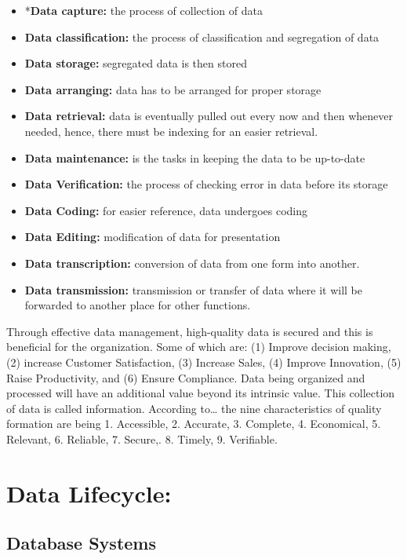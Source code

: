 \documentclass[
  letterpaper,
  DIV=11,
  numbers=noendperiod]{scrreprt}
\providecommand{\tightlist}{%
  \setlength{\itemsep}{0pt}\setlength{\parskip}{0pt}}\usepackage{longtable,booktabs,array}
\begin{document}
\begin{itemize}
\tightlist
\item
  *\textbf{Data capture:} the process of collection of data
\item
  \textbf{Data classification:} the process of classification and
  segregation of data
\item
  \textbf{Data storage:} segregated data is then stored
\item
  \textbf{Data arranging:} data has to be arranged for proper storage
\item
  \textbf{Data retrieval:} data is eventually pulled out every now and
  then whenever needed, hence, there must be indexing for an easier
  retrieval.
\item
  \textbf{Data maintenance:} is the tasks in keeping the data to be
  up-to-date
\item
  \textbf{Data Verification:} the process of checking error in data
  before its storage
\item
  \textbf{Data Coding:} for easier reference, data undergoes coding
\item
  \textbf{Data Editing:} modification of data for presentation
\item
  \textbf{Data transcription:} conversion of data from one form into
  another.
\item
  \textbf{Data transmission:} transmission or transfer of data where it
  will be forwarded to another place for other functions.
\end{itemize}

Through effective data management, high-quality data is secured and this
is beneficial for the organization. Some of which are: (1) Improve
decision making, (2) increase Customer Satisfaction, (3) Increase Sales,
(4) Improve Innovation, (5) Raise Productivity, and (6) Ensure
Compliance. Data being organized and processed will have an additional
value beyond its intrinsic value. This collection of data is called
information. According to\ldots{} the nine characteristics of quality
formation are being 1. Accessible, 2. Accurate, 3. Complete, 4.
Economical, 5. Relevant, 6. Reliable, 7. Secure,. 8. Timely, 9.
Verifiable.

\section{Data Lifecycle:}\label{data-lifecycle}

\subsection{Database Systems}\label{database-systems}
\end{document}
